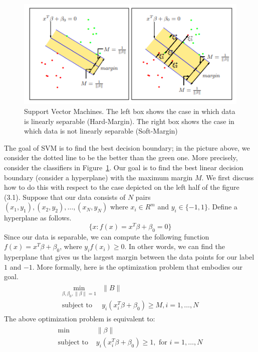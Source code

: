 \documentclass[twoside]{article}
\begin{document}
\begin{figure}[h]
\begin{center}
\includegraphics[scale=1.1]{SVMs.PNG}
\end{center}
\caption{Support Vector Machines. The left box shows the case in which data is linearly separable (Hard-Margin). The right box shows the case in which data is not linearly separable (Soft-Margin)}
\label{fig:figure1}
\end{figure}

The goal of SVM is to find the best decision boundary; in the picture above, we consider the dotted line to be the better than the green one. More precisely, consider the classifiers in Figure~\ref{fig:figure1}.
Our goal is to find the best linear decision boundary (consider a hyperplane) with the maximum margin $M$. We first discuss how to do this with respect to the case depicted on the left half of the figure (3.1). Suppose that our data consists of $N$ pairs $(x_1,y_1), (x_2,y_2), \dots ,(x_N,y_N)$ where $x_i \in R^{m}$ and $y_i \in \{-1,1\}$. Define a hyperplane as follows.
%
\begin{equation*}
    \{x: f(x) = x^{T}\beta + \beta_{0} = 0\}
\end{equation*}
%
Since our data is separable, we can compute the following function $f(x) = x^{T}\beta + \beta_{0}$, where $y_{i}f(x_{i}) \geq 0$. In other words, we can find the hyperplane that gives us the largest margin between the data points for our label $1$ and $-1$. More formally, here is the optimization problem that embodies our goal.
\begin{align} \label{eq:1}
\begin{split}
    \min_{\beta, \beta_{0}, \|\beta\| = 1} &\|B\|\\
    \text{subject to } &y_{i}(x_{i}^{T}\beta + \beta_{0}) \geq M,  i = 1, \dots, N
\end{split}
\end{align}
%
The above optimization problem is equivalent to:
\begin{align} \label{eq:2}
\begin{split}
    \min &\|\beta\|\\
    \text{subject to } &y_{i}(x_{i}^{T}\beta + \beta_{0}) \geq 1, \text{ for } i = 1, \dots, N
\end{split}
\end{align}
\end{document}
